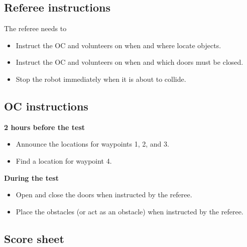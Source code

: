 \subsection{Referee instructions}

The referee needs to
\begin{itemize}
	\item Instruct the OC and volunteers on when and where locate objects.
	\item Instruct the OC and volunteers on when and which doors must be closed.
	\item Stop the robot immediately when it is about to collide.
\end{itemize}

\subsection{OC instructions}

\textbf{2 hours before the test}
\begin{itemize}
	\item Announce the locations for waypoints 1, 2, and 3.
	\item Find a location for waypoint 4. 
\end{itemize}

\textbf{During the test}
\begin{itemize}
	\item Open and close the doors when instructed by the referee.
	\item Place the obstacles (or act as an obstacle) when instructed by the referee.
\end{itemize}

\newpage

\subsection{Score sheet}


